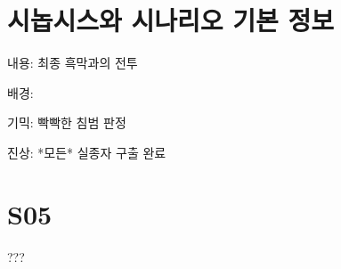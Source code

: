 \documentclass{report}
\begin{document}
	\section{시놉시스와 시나리오 기본 정보}
		내용: 최종 흑막과의 전투
		
		배경: 
		
		기믹: 빡빡한 침범 판정
		
		진상: *모든* 실종자 구출 완료
	
	\section{S05}
		???
\end{document}
